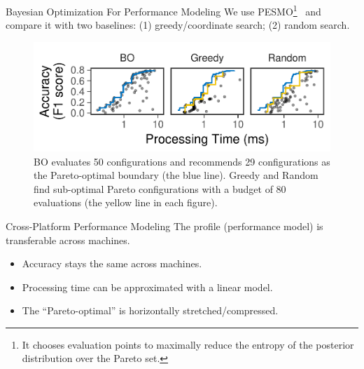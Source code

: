 \begin{frame}{Bayesian Optimization For Performance Modeling}
  \vspace{1em} We use PESMO\footnote{It chooses evaluation points to maximally
    reduce the entropy of the posterior distribution over the Pareto
    set.}~\cite{hernandez2016predictive} and compare it with two baselines: (1)
  greedy/coordinate search; (2) random search.

  \pause
  \begin{figure}
    \centering
    \includegraphics[width=0.95\linewidth]{figures/serving-eval-bo.pdf}
    \caption{BO evaluates 50 configurations and recommends 29 configurations as
      the Pareto-optimal boundary (the blue line). Greedy and Random find
      sub-optimal Pareto configurations with a budget of 80 evaluations (the
      yellow line in each figure).}
  \end{figure}
\end{frame}

\begin{frame}{Cross-Platform Performance Modeling}
  \vspace{1em}
  The profile (performance model) is transferable across machines.
  \begin{itemize}
  \item Accuracy stays the same across machines.
  \item Processing time can be approximated with a linear model.
  \item The ``Pareto-optimal'' is horizontally stretched/compressed.
  \end{itemize}

\end{frame}

